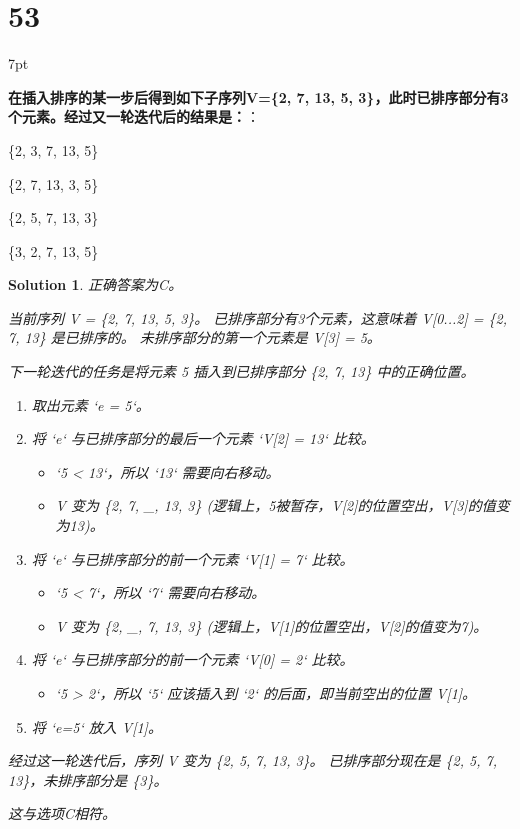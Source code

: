 \documentclass[UTF8]{report}
\newtheorem{solution}{Solution}
\theoremstyle{MyLineTheoremStyle} %
\theoremstyle{MyBlockTheoremStyle} %
\theoremstyle{MySubsubsectionStyle} %
\newenvironment{graybox}{%
        \def\FrameCommand{%
        \hspace{1pt}%
        {\color{gray}\small \vrule width 2pt}%
        {\color{graybox_color}\vrule width 4pt}%
        \colorbox{graybox_color}%
        }%
        \MakeFramed{\advance\hsize-\width\FrameRestore}%
        \noindent\hspace{-4.55pt}%
        \begin{adjustwidth}{}{7pt}%
        \vspace{2pt}\vspace{2pt}%
        }
        {%
        \vspace{2pt}\end{adjustwidth}\endMakeFramed%
        }
\begin{document}
\section*{53}

\begin{graybox}
\textbf{在插入排序的某一步后得到如下子序列V=\{2, 7, 13, 5, 3\}，此时已排序部分有3个元素。经过又一轮迭代后的结果是：}：
\begin{circledenum}
    \item \{2, 3, 7, 13, 5\}
    \item \{2, 7, 13, 3, 5\}
    \item \{2, 5, 7, 13, 3\}
    \item \{3, 2, 7, 13, 5\}
\end{circledenum}
\end{graybox}

\begin{solution}
正确答案为C。

当前序列 V = \{2, 7, 13, 5, 3\}。
已排序部分有3个元素，这意味着 V[0...2] = \{2, 7, 13\} 是已排序的。
未排序部分的第一个元素是 V[3] = 5。

下一轮迭代的任务是将元素 5 插入到已排序部分 \{2, 7, 13\} 中的正确位置。
\begin{enumerate}
    \item 取出元素 `e = 5`。
    \item 将 `e` 与已排序部分的最后一个元素 `V[2] = 13` 比较。
    \begin{itemize}
        \item `5 < 13`，所以 `13` 需要向右移动。
        \item V 变为 \{2, 7, \_, 13, 3\} (逻辑上，5被暂存，V[2]的位置空出，V[3]的值变为13)。
    \end{itemize}
    \item 将 `e` 与已排序部分的前一个元素 `V[1] = 7` 比较。
    \begin{itemize}
        \item `5 < 7`，所以 `7` 需要向右移动。
        \item V 变为 \{2, \_, 7, 13, 3\} (逻辑上，V[1]的位置空出，V[2]的值变为7)。
    \end{itemize}
    \item 将 `e` 与已排序部分的前一个元素 `V[0] = 2` 比较。
    \begin{itemize}
        \item `5 > 2`，所以 `5` 应该插入到 `2` 的后面，即当前空出的位置 V[1]。
    \end{itemize}
    \item 将 `e=5` 放入 V[1]。
\end{enumerate}
经过这一轮迭代后，序列 V 变为 \{2, 5, 7, 13, 3\}。
已排序部分现在是 \{2, 5, 7, 13\}，未排序部分是 \{3\}。

这与选项C相符。
\end{solution}
\end{document}

